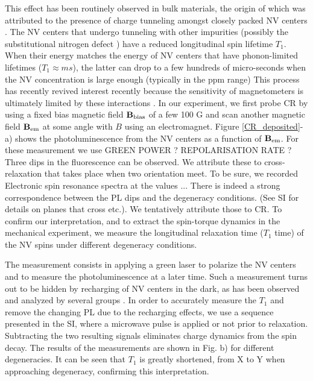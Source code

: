 \documentclass[preprintnumbers,amsmath,amssymb,superscriptaddress,twocolumn,showpacs]{revtex4-1}
\begin{document}
This effect has been routinely observed in bulk materials, the origin of which was attributed to the presence of charge tunneling amongst closely packed NV centers \cite{choi_depolarization_2017}. The NV centers that undergo tunneling with other impurities (possibly the substitutional nitrogen defect \cite{Manson}) have a reduced longitudinal spin lifetime $T_1$. When their energy matches the energy of NV centers that have phonon-limited lifetimes ($T_1\approx ms$), the latter can drop 
to a few hundreds of micro-seconds \cite{Jarmola} when the NV concentration is large enough (typically in the ppm range)
This process has recently revived interest recently because the sensitivity of magnetometers is ultimately limited by these interactions \cite{Zhou}. 
In our experiment, we first probe CR by using a fixed bias magnetic field $\bf B_{\rm bias}$ of a few 100 G and scan another magnetic field $\bf B_{\rm em}$ at some angle with $B$ using an electromagnet. 
Figure \ref{CR_deposited}-a) shows the photoluminescence from the NV centers as a function of $\bf B_{\rm em}$. 
For these measurement we use GREEN POWER ? REPOLARISATION RATE ? 
Three dips in the fluorescence can be observed. 
We attribute these to cross-relaxation that takes place when two orientation meet. To be sure, we recorded Electronic spin resonance spectra at the values ...
There is indeed a strong correspondence between the PL dips and the degeneracy conditions. 
(See SI for details on planes that cross etc.). 
We tentatively attribute those to CR. 
To confirm our interpretation, and to extract the spin-torque dynamics in the mechanical experiment, we measure the longitudinal relaxation time ($T_1$ time) of the NV spins under different degeneracy conditions.

The measurement consists in applying a green laser to polarize the NV centers and to measure the photoluminescence at a later time. 
Such a measurement turns out to be hidden by recharging of NV centers in the dark, as has been observed and analyzed by several groups \cite{choi_depolarization_2017, mrozek_longitudinal_2015, giri_selective_2019, giri_coupled_2018}.
In order to accurately measure the $T_1$ and remove the changing PL due to the recharging effects, we use a sequence presented in the SI, where a microwave pulse is applied or not prior to relaxation. Subtracting the two resulting signals eliminates charge dynamics from the spin decay.
The results of the measurements are shown in Fig. \label{CR_deposited}b) for different degeneracies. 
It can be seen that $T_1$ is greatly shortened, from X to Y when approaching degeneracy, confirming this interpretation.
\end{document}
